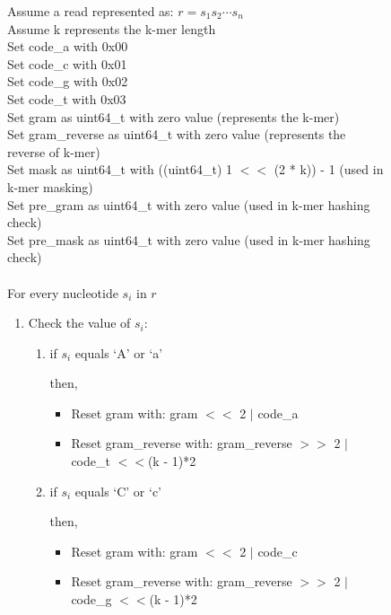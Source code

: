 \documentclass[12pt,openany]{llncs}
\begin{document}
\begin{figure}
\vspace{0.1cm}
\begin{bordered}
Assume a read represented as: $r=s_1s_2\cdots s_n$
\\
Assume k represents the k-mer length
\\
Set code\_a with 0x00
\\
Set code\_c with 0x01
\\
Set code\_g with 0x02
\\
Set code\_t with 0x03
\\
Set gram as uint64\_t with zero value (represents the k-mer)
\\
Set gram\_reverse as uint64\_t with zero value (represents the reverse of k-mer)
\\
Set mask as uint64\_t with ((uint64\_t) 1 $<<$ (2 * k)) - 1 (used in k-mer masking)
\\
Set pre\_gram as uint64\_t with zero value (used in k-mer hashing check)
\\
Set pre\_mask as uint64\_t with zero value (used in k-mer hashing check)
\\
\\
For every nucleotide $s_i$ in $r$ 
\begin{enumerate}
\addtolength{\itemindent}{1cm} 
\item Check the value of $s_i$: 
\vspace{-2mm}
\begin{enumerate}
\addtolength{\itemindent}{1cm}

	\item if $s_i$ equals `A' or `a'
	
	\noindent\hspace{1cm}then,
	
	\begin{itemize}
    \addtolength{\itemindent}{1cm}
	  \item Reset gram with: gram $<<$ 2 $|$ code\_a
      \item Reset gram\_reverse with: gram\_reverse $>>$ 2 $|$ code\_t $<<$(k - 1)*2
	\end{itemize}
	
	\item if $s_i$ equals `C' or `c'
	
	\noindent\hspace{1cm}then,

	\begin{itemize}
    \addtolength{\itemindent}{1cm}
	  \item Reset gram with: gram $<<$ 2 $|$ code\_c
	  \item Reset gram\_reverse with: gram\_reverse $>>$ 2 $|$ code\_g $<<$(k - 1)*2
	\end{itemize}
	

\end{enumerate}
\end{enumerate}
\end{bordered}
\end{figure}
\end{document}
